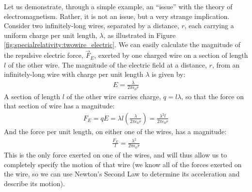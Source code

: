 Let us demonstrate, through a simple example, an ``issue'' with the theory of electromagnetism. Rather, it is not an issue, but a very strange implication. Consider two infinitely-long wires, separated by a distance, $r$, each carrying a uniform charge per unit length, $\lambda$, as illustrated in Figure \ref{fig:specialrelativity:twowire_electric}. 
We can easily calculate the magnitude of the repulsive electric force, $\vec F_E$, exerted by one charged wire on a section of length $l$ of the other wire. The magnitude of the electric field at a distance, $r$, from an infinitely-long wire with charge per unit length $\lambda$ is given by:
\begin{align*}
E = \frac{\lambda}{2\pi \epsilon_0r}
\end{align*}
A section of length $l$ of the other wire carries charge, $q=l\lambda$, so that the force on that section of wire has a magnitude:
\begin{align*}
F_E=qE=\lambda l \left( \frac{\lambda}{2\pi \epsilon_0r}\right) = \frac{\lambda^2 l}{2\pi \epsilon_0r}
\end{align*}
And the force per unit length, on either one of the wires, has a magnitude:
\begin{align*}
\frac{F_E}{l}=\frac{\lambda^2}{2\pi \epsilon_0r}
\end{align*}
This is the only force exerted on one of the wires, and will thus allow us to completely specify the motion of that wire (we know all of the forces exerted on the wire, so we can use Newton's Second Law to determine its acceleration and describe its motion).

